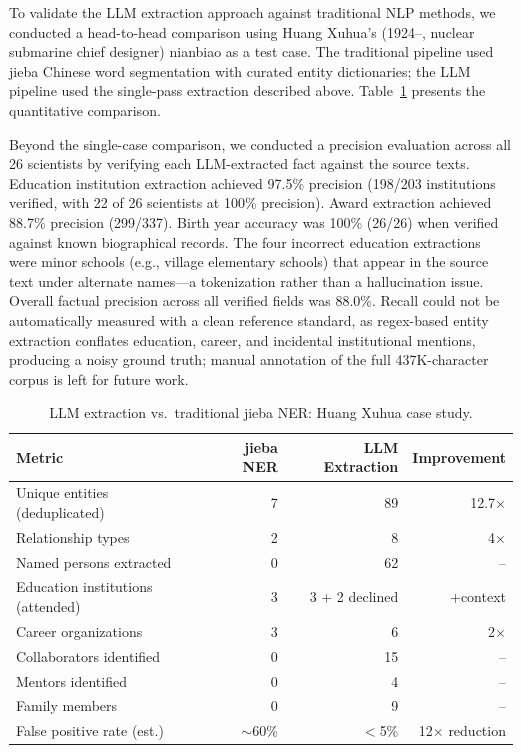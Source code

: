 \documentclass[review]{elsarticle}
\begin{document}
To validate the LLM extraction approach against traditional NLP methods, we conducted a head-to-head comparison using Huang Xuhua's (1924--, nuclear submarine chief designer) nianbiao as a test case. The traditional pipeline used jieba Chinese word segmentation with curated entity dictionaries; the LLM pipeline used the single-pass extraction described above. Table~\ref{tab:llm_vs_ner} presents the quantitative comparison.

Beyond the single-case comparison, we conducted a precision evaluation across all 26 scientists by verifying each LLM-extracted fact against the source texts. Education institution extraction achieved 97.5\% precision (198/203 institutions verified, with 22 of 26 scientists at 100\% precision). Award extraction achieved 88.7\% precision (299/337). Birth year accuracy was 100\% (26/26) when verified against known biographical records. The four incorrect education extractions were minor schools (e.g., village elementary schools) that appear in the source text under alternate names—a tokenization rather than a hallucination issue. Overall factual precision across all verified fields was 88.0\%. Recall could not be automatically measured with a clean reference standard, as regex-based entity extraction conflates education, career, and incidental institutional mentions, producing a noisy ground truth; manual annotation of the full 437K-character corpus is left for future work.

\begin{table}[ht]
\centering
\caption{LLM extraction vs.\ traditional jieba NER: Huang Xuhua case study.}
\label{tab:llm_vs_ner}
\begin{tabular}{lrrr}
\toprule
Metric & jieba NER & LLM Extraction & Improvement \\
\midrule
Unique entities (deduplicated) & 7 & 89 & 12.7$\times$ \\
Relationship types & 2 & 8 & 4$\times$ \\
Named persons extracted & 0 & 62 & -- \\
Education institutions (attended) & 3 & 3 + 2 declined & +context \\
Career organizations & 3 & 6 & 2$\times$ \\
Collaborators identified & 0 & 15 & -- \\
Mentors identified & 0 & 4 & -- \\
Family members & 0 & 9 & -- \\
False positive rate (est.) & $\sim$60\% & $<$5\% & 12$\times$ reduction \\
\bottomrule
\end{tabular}
\end{table}
\end{document}
